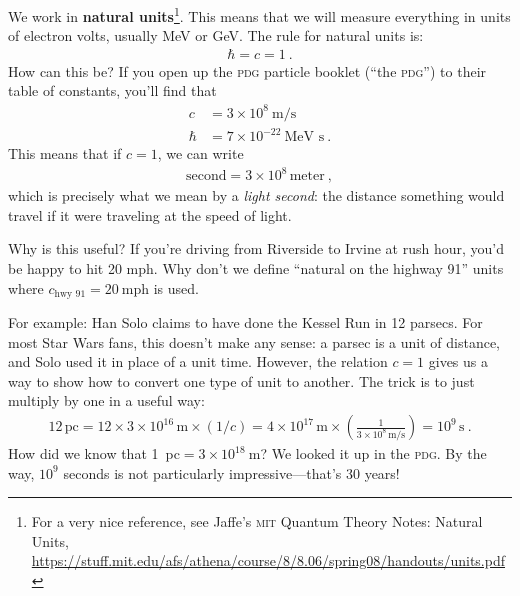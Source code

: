 \documentclass[12pt]{article}
\numberwithin{equation}{section}    %
\newcommand{\acro}[1]{\textsc{\MakeLowercase{#1}}}
\begin{document}
We work in \textbf{natural units}\footnote{For a very nice reference, see Jaffe's \acro{MIT} Quantum Theory Notes: Natural Units, \url{https://stuff.mit.edu/afs/athena/course/8/8.06/spring08/handouts/units.pdf}}. This means that we will measure everything in units of electron volts, usually MeV or GeV. The rule for natural units is:
\begin{align}
	\hbar = c = 1 \ .
\end{align}
How can this be? If you open up the \acro{PDG} particle booklet (``the \acro{PDG}'') to their table of constants, you'll find that
\begin{align}
	c & = 3 \times 10^8~\text{m}/\text{s}
	\\
	\hbar &= 7 \times 10^{-22}~\text{MeV~s} \ .
\end{align}
This means that if $c=1$, we can write
\begin{align}
	\text{second} = 3\times 10^8 \, \text{meter} \ ,
\end{align}
which is precisely what we mean by a \emph{light second}: the distance something would travel if it were traveling at the speed of light. 

Why is this useful? If you're driving from Riverside to Irvine at rush hour, you'd be happy to hit 20 mph. Why don't we define ``natural on the highway 91'' units where $c_\text{hwy 91} = 20~\text{mph}$ is used.

For example: Han Solo claims to have done the Kessel Run in 12 parsecs. For most Star Wars fans, this doesn't make any sense: a parsec is a unit of distance, and Solo used it in place of a unit time. However, the relation $c=1$ gives us a way to show how to convert one type of unit to another. The trick is to just multiply by one in a useful way:
\begin{align}
	12\,\text{pc}
	= 12 \times 3 \times 10^{16}\,\text{m}\times (1/c)
	= 4\times 10^{17}\, \text{m}
	\times\left(\frac{1}{3\times 10^{8}\,\text{m}/\text{s}}\right)
	= 10^9\, \text{s} \ .
\end{align}
How did we know that 1~pc$= 3\times 10^{18}~$m? We looked it up in the \acro{PDG}. By the way, $10^9$ seconds is not particularly impressive---that's 30 years!
\end{document}
